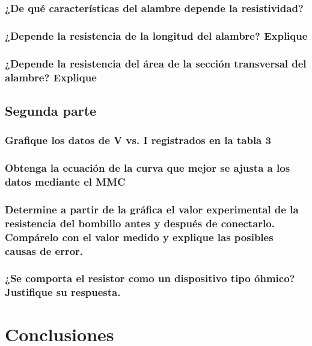 \documentclass[10pt]{article}
\begin{document}
\begin{multicols}{2}
	\subsubsection*{¿De qué características del alambre depende la resistividad?}

	\subsubsection*{¿Depende la resistencia de la longitud del alambre? Explique}

	\subsubsection*{¿Depende la resistencia del área de la sección transversal del alambre?
		Explique}

	\subsection{Segunda parte}

	\subsubsection*{Grafique los datos de V vs. I registrados en la tabla 3}

	\subsubsection*{Obtenga la ecuación de la curva que mejor se ajusta a los datos mediante el MMC}

	\subsubsection*{Determine a partir de la gráfica el valor experimental de la resistencia del bombillo antes y
		después de conectarlo. Compárelo con el valor medido y explique las posibles causas de error. }

	\subsubsection*{¿Se comporta el resistor como un dispositivo tipo óhmico? Justifique su respuesta. }

	





\end{multicols}

\section{Conclusiones}

\newpage


\end{document}
